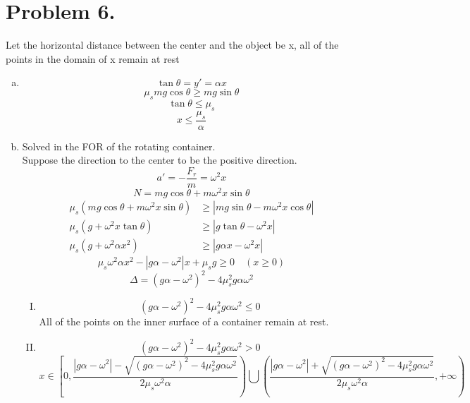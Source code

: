 \documentclass{article}
\begin{document}
\section*{Problem 6.}
Let the horizontal distance between the center and the object be x, all of the points in the domain of x remain at rest
\begin{enumerate}[(a)]
	\item
	$$\tan\theta=y'=\alpha x$$
	$$\mu_smg\cos\theta\geqslant mg\sin\theta$$
	$$\tan\theta\leqslant\mu_s$$
	$$x\leqslant\frac{\mu_s}{\alpha}$$
	\item
	Solved in the FOR of the rotating container.\\
	Suppose the direction to the center to be the positive direction.\\
	$$a'=-\frac{F_r}{m}=\omega^2x$$
	$$N=mg\cos\theta+m\omega^2x\sin\theta$$
	\begin{align*}
	\mu_s(mg\cos\theta+m\omega^2x\sin\theta)&\geqslant|mg\sin\theta-m\omega^2x\cos\theta|\\
	\mu_s(g+\omega^2x\tan\theta)&\geqslant|g\tan\theta-\omega^2x|\\
	\mu_s(g+\omega^2\alpha x^2)&\geqslant|g\alpha x-\omega^2x|
	\end{align*}
	$$\mu_s\omega^2\alpha x^2-|g\alpha-\omega^2|x+\mu_sg\geqslant0\quad (x\geqslant0)$$
	$$\Delta=(g\alpha-\omega^2)^2-4\mu_s^2g\alpha\omega^2$$
	\begin{enumerate}[I.]
	\item
	$$(g\alpha-\omega^2)^2-4\mu_s^2g\alpha\omega^2\leqslant0$$
	All of the points on the inner surface of a container remain at rest.
	\item
	$$(g\alpha-\omega^2)^2-4\mu_s^2g\alpha\omega^2>0$$
	$$x\in\left[0,\frac{|g\alpha-\omega^2|-\sqrt{(g\alpha-\omega^2)^2-4\mu_s^2g\alpha\omega^2}}{2\mu_s\omega^2\alpha}\right)\bigcup\left(\frac{|g\alpha-\omega^2|+\sqrt{(g\alpha-\omega^2)^2-4\mu_s^2g\alpha\omega^2}}{2\mu_s\omega^2\alpha},+\infty\right)$$
	\end{enumerate}
\end{enumerate}
\end{document}
